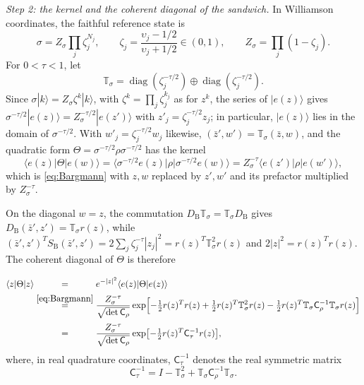 \documentclass[11pt]{amsart}
\numberwithin{equation}{section}
\theoremstyle{definition}
\newcommand{\diag}{\operatorname{diag}}
\begin{document}
\smallskip
\emph{Step 2: the kernel and the coherent diagonal of the sandwich.}
In Williamson coordinates, the faithful reference state is
\[
 \sigma=Z_\sigma\prod_j\zeta_j^{N_j},\qquad
 \zeta_j=\frac{\upsilon_j-1/2}{\upsilon_j+1/2}\in(0,1),\qquad
 Z_\sigma=\prod_j(1-\zeta_j).
\]
For \(0<\tau<1\), let
\[
 \mathbb T_\sigma=\diag(\zeta_j^{-\tau/2})\oplus\diag(\zeta_j^{-\tau/2}).
\]
Since \(\sigma|k\rangle=Z_\sigma\zeta^k|k\rangle\), with
\(\zeta^k=\prod_j\zeta_j^{k_j}\) as for \(z^k\), the series of
\(|e(z)\rangle\) gives
\(\sigma^{-\tau/2}|e(z)\rangle=Z_\sigma^{-\tau/2}|e(z')\rangle\) with
\(z'_j=\zeta_j^{-\tau/2}z_j\); in particular, \(|e(z)\rangle\) lies in
the domain of \(\sigma^{-\tau/2}\). With \(w'_j=\zeta_j^{-\tau/2}w_j\)
likewise, \((\bar z',w')=\mathbb T_\sigma(\bar z,w)\), and the quadratic
form \(\Theta=\sigma^{-\tau/2}\rho\sigma^{-\tau/2}\) has the kernel
\[
 \langle e(z)|\Theta|e(w)\rangle
 =\langle\sigma^{-\tau/2}e(z)|\rho|\sigma^{-\tau/2}e(w)\rangle
 =Z_\sigma^{-\tau}\langle e(z')|\rho|e(w')\rangle,
\]
which is \eqref{eq:Bargmann} with \(z,w\) replaced by \(z',w'\) and its
prefactor multiplied by \(Z_\sigma^{-\tau}\).

On the diagonal \(w=z\), the commutation
\(D_{\mathrm B}\mathbb T_\sigma=\mathbb T_\sigma D_{\mathrm B}\) gives
\(D_{\mathrm B}(\bar z',z')=\mathbb T_\sigma r(z)\), while
\((\bar z',z')^TS_{\mathrm B}(\bar z',z')=2\sum_j\zeta_j^{-\tau}|z_j|^2
=r(z)^T\mathbb T_\sigma^2r(z)\) and \(2|z|^2=r(z)^Tr(z)\). The coherent
diagonal of \(\Theta\) is therefore
\begin{align*}
 \langle z|\Theta|z\rangle
 &\overset{\phantom{\eqref{eq:Bargmann}}}{=}e^{-|z|^2}\langle e(z)|\Theta|e(z)\rangle\\
 &\overset{\eqref{eq:Bargmann}}{=}
  \frac{Z_\sigma^{-\tau}}{\sqrt{\det\mathsf C_\rho}}
  \exp\Bigl[-\tfrac12r(z)^Tr(z)+\tfrac12r(z)^T\mathbb T_\sigma^2r(z)
  -\tfrac12r(z)^T\mathbb T_\sigma\mathsf C_\rho^{-1}\mathbb T_\sigma r(z)\Bigr]\\
 &\overset{\phantom{\eqref{eq:Bargmann}}}{=}\frac{Z_\sigma^{-\tau}}{\sqrt{\det\mathsf C_\rho}}
  \exp\bigl[-\tfrac12r(z)^T\mathsf C_\tau^{-1}r(z)\bigr],
\end{align*}
where, in real quadrature coordinates, \(\mathsf C_\tau^{-1}\) denotes
the real symmetric matrix
\begin{equation}
 \mathsf C_\tau^{-1}
 =I-\mathbb T_\sigma^2
  +\mathbb T_\sigma\mathsf C_\rho^{-1}\mathbb T_\sigma.
 \label{eq:Ctau-inverse}
\end{equation}
\end{document}

